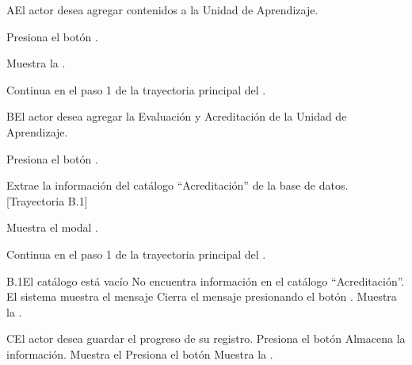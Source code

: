 \begin{UCtrayectoriaA}{A}{El actor desea agregar contenidos a la Unidad de Aprendizaje.}

\UCpaso[\UCactor] Presiona el botón .

\UCpaso Muestra la .

\UCpaso Continua en el paso 1 de la trayectoria principal del .
\end{UCtrayectoriaA}

\begin{UCtrayectoriaA}{B}{El actor desea agregar la Evaluación y Acreditación de la Unidad de Aprendizaje.}

\UCpaso[\UCactor] Presiona el botón .

\UCpaso Extrae la información del catálogo ``Acreditación'' de la base de datos. [Trayectoria B.1]

\UCpaso Muestra el modal .

\UCpaso Continua en el paso 1 de la trayectoria principal del .
\end{UCtrayectoriaA}

\begin{UCtrayectoriaA}{B.1}{El catálogo está vacío}
    \UCpaso No encuentra información en el catálogo ``Acreditación''.
    \UCpaso El sistema muestra el mensaje 
    \UCpaso[\UCactor] Cierra el mensaje presionando el botón .
    \UCpaso Muestra la .
\end{UCtrayectoriaA}

\begin{UCtrayectoriaA}{C}{El actor desea guardar el progreso de su registro.}
\UCpaso[\UCactor] Presiona el botón 
\UCpaso Almacena la información.
\UCpaso Muestra el 
\UCpaso[\UCactor] Presiona el botón  
\UCpaso Muestra la .
\end{UCtrayectoriaA}

